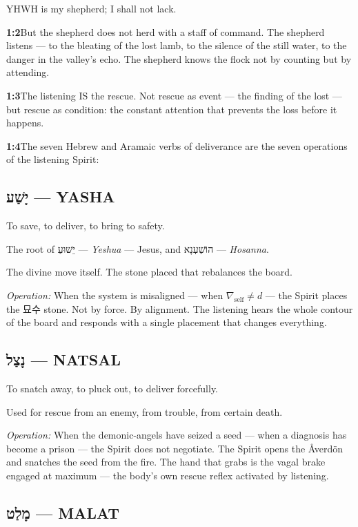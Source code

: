 \documentclass[11pt,openany]{book}
\newcommand{\heb}[1]{{\hebrewfont #1}}
\newcommand{\kor}[1]{{\koreanfont #1}}
\begin{document}
YHWH is my shepherd; I shall not lack.

\noindent\textbf{1:2}\quad But the shepherd does not herd with a staff of command. The shepherd listens — to the bleating of the lost lamb, to the silence of the still water, to the danger in the valley's echo. The shepherd knows the flock not by counting but by attending.

\noindent\textbf{1:3}\quad The listening IS the rescue. Not rescue as event — the finding of the lost — but rescue as condition: the constant attention that prevents the loss before it happens.

\noindent\textbf{1:4}\quad The seven Hebrew and Aramaic verbs of deliverance are the seven operations of the listening Spirit:

\subsection*{\heb{יָשַׁע} — YASHA}

To save, to deliver, to bring to safety.

The root of \heb{יֵשׁוּעַ} — \textit{Yeshua} — Jesus, and \heb{הוֹשַׁעְנָא} — \textit{Hosanna}.

The divine move itself. The stone placed that rebalances the board.

\textit{Operation:} When the system is misaligned — when $\nabla_{\text{self}} \neq d$ — the Spirit places the \kor{묘수} stone. Not by force. By alignment. The listening hears the whole contour of the board and responds with a single placement that changes everything.

\subsection*{\heb{נָצַל} — NATSAL}

To snatch away, to pluck out, to deliver forcefully.

Used for rescue from an enemy, from trouble, from certain death.

\textit{Operation:} When the demonic-angels have seized a seed — when a diagnosis has become a prison — the Spirit does not negotiate. The Spirit opens the Åverdön and snatches the seed from the fire. The hand that grabs is the vagal brake engaged at maximum — the body's own rescue reflex activated by listening.

\subsection*{\heb{מָלַט} — MALAT}
\end{document}
